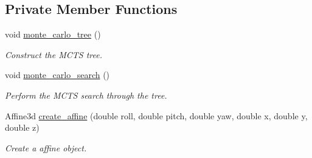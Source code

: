\subsection*{Private Member Functions}
\begin{DoxyCompactItemize}
\item 
\mbox{\label{classMCT__Search2_a3189949ccb48da64c62e0c1c9ae66f15}} 
void \hyperlink{classMCT__Search2_a3189949ccb48da64c62e0c1c9ae66f15}{monte\+\_\+carlo\+\_\+tree} ()
\begin{DoxyCompactList}\small\item\em Construct the M\+C\+TS tree. \end{DoxyCompactList}\item 
\mbox{\label{classMCT__Search2_a5c4aa4b4b1adcb8016490074fdd653f5}} 
void \hyperlink{classMCT__Search2_a5c4aa4b4b1adcb8016490074fdd653f5}{monte\+\_\+carlo\+\_\+search} ()
\begin{DoxyCompactList}\small\item\em Perform the M\+C\+TS search through the tree. \end{DoxyCompactList}\item 
Affine3d \hyperlink{classMCT__Search2_afabc664bbcbb6694a66c5a0b78bc0f68}{create\+\_\+affine} (double roll, double pitch, double yaw, double x, double y, double z)
\begin{DoxyCompactList}\small\item\em Create a affine object. \end{DoxyCompactList}\end{DoxyCompactItemize}

